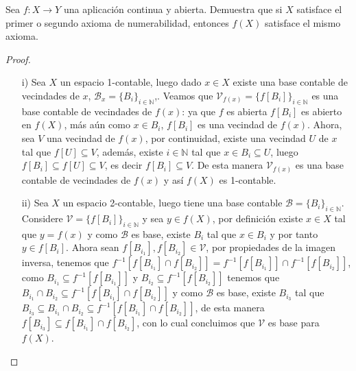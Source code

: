 
\item Sea $f: X \to Y$ una aplicación continua y abierta. Demuestra que si $X$ satisface el primer o segundo axioma de numerabilidad, entonces $f(X)$ satisface el mismo axioma.

\begin{proof}
  \begin{enumerate}
  \item[i)] Sea $X$ un espacio 1-contable, luego dado $x \in X$ existe una base contable de vecindades de $x$, $\mathcal{B}_x=\{B_i\}_{i\in \mathbb{N}}$,. Veamos que $\mathcal{V}_{f(x)}=\{f[B_i]\}_{i\in\mathbb{N}}$ es una base contable de vecindades de $f(x)$: ya que $f$ es abierta $f[B_i]$ es abierto en $f(X)$, más aún como $x \in B_i$, $f[B_i]$ es una vecindad de $f(x)$. Ahora, sea $V$ una vecindad de $f(x)$, por continuidad, existe una vecindad $U$ de $x$ tal que $f[U] \subseteq V$, además, existe $i \in \mathbb{N}$ tal que $x \in B_i \subseteq U$, luego $f[B_i] \subseteq f[U] \subseteq V$, es decir $f[B_i] \subseteq V$. De esta manera $\mathcal{V}_{f(x)}$ es una base contable de vecindades de $f(x)$ y así $f(X)$ es 1-contable.\\ 
  \item [ii)] Sea $X$ un espacio 2-contable, luego tiene una base contable $\mathcal{B} = \{B_i\}_{i \in \mathbb{N}}$. Considere $\mathcal{V} = \{f[B_i]\}_{i\in\mathbb{N}}$ y sea $y \in f(X)$, por definición existe $x \in X$ tal que $y = f(x)$ y como $\mathcal{B}$ es base, existe $B_i$ tal que $x \in B_i$ y por tanto $y \in f[B_i]$. Ahora sean $f[B_{i_1}], f[B_{i_2}] \in \mathcal{V}$, por propiedades de la imagen inversa, tenemos que $f^{-1}[f[B_{i_1}]\cap f[B_{i_2}]]=f^{-1}[f[B_{i_1}]]\cap f^{-1}[f[B_{i_2}]]$, como $B_{i_1}\subseteq f^{-1}[f[B_{i_1}]]$ y $B_{i_2} \subseteq f^{-1}[f[B_{i_2}]]$ tenemos que $B_{i_1} \cap B_{i_2} \subseteq f^{-1}[f[B_{i_1}]\cap f[B_{i_2}]]$ y como $\mathcal{B}$ es base, existe $B_{i_3}$ tal que $B_{i_3} \subseteq B_{i_1} \cap B_{i_2} \subseteq f^{-1}[f[B_{i_1}]\cap f[B_{i_2}]]$, de esta manera $f[B_{i_3}] \subseteq f[B_{i_1}] \cap f[B_{i_2}]$, con lo cual concluimos que $\mathcal{V}$ es base para $f(X)$.

  \end{enumerate}
\end{proof}